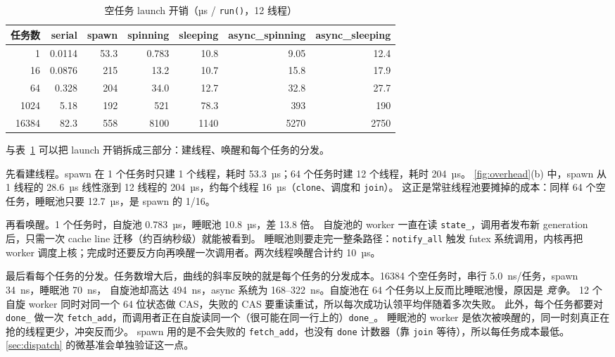 \documentclass[11pt,a4paper]{ctexart}
\begin{document}
\begin{table}[H]
\centering
\caption{空任务 launch 开销（µs / \texttt{run()}，12 线程）}
\label{tab:overhead}
\small
\begin{tabular}{rrrrrrr}
\toprule
任务数 & serial & spawn & spinning & sleeping & async\_\allowbreak{}spinning & async\_\allowbreak{}sleeping \\
\midrule
1 & 0.0114 & 53.3 & 0.783 & 10.8 & 9.05 & 12.4 \\
16 & 0.0876 & 215 & 13.2 & 10.7 & 15.8 & 17.9 \\
64 & 0.328 & 204 & 34.0 & 12.7 & 32.8 & 27.7 \\
1024 & 5.18 & 192 & 521 & 78.3 & 393 & 190 \\
16384 & 82.3 & 558 & 8100 & 1140 & 5270 & 2750 \\
\bottomrule
\end{tabular}
\end{table}

 与表~\ref{tab:overhead} 可以把 launch 开销拆成三部分：建线程、唤醒和每个任务的分发。

先看建线程。spawn 在 1 个任务时只建 1 个线程，耗时 53.3~µs；64 个任务时建 12 个线程，耗时 204~µs。
\cref{fig:overhead}(b) 中，spawn 从 1 线程的 28.6~µs 线性涨到 12 线程的 204~µs，约每个线程 16~µs（\texttt{clone}、调度和 \texttt{join}）。
这正是常驻线程池要摊掉的成本：同样 64 个空任务，睡眠池只要 12.7~µs，是 spawn 的 1/16。

再看唤醒。1 个任务时，自旋池 0.783~µs，睡眠池 10.8~µs，差 13.8 倍。
自旋池的 worker 一直在读 \texttt{state\_\allowbreak{}}，调用者发布新 generation 后，只需一次 cache line 迁移（约百纳秒级）就能被看到。
睡眠池则要走完一整条路径：\texttt{notify\_\allowbreak{}all} 触发 futex 系统调用，内核再把 worker 调度上核；完成时还要反方向再唤醒一次调用者。两次线程唤醒合计约 10~µs。

最后看每个任务的分发。任务数增大后，曲线的斜率反映的就是每个任务的分发成本。16384 个空任务时，串行 5.0~ns/任务，spawn 34~ns，睡眠池 70~ns，
自旋池却高达 494~ns，async 系统为 168--322~ns。自旋池在 64 个任务以上反而比睡眠池慢，原因是 \emph{竞争}。
12 个自旋 worker 同时对同一个 64 位状态做 CAS，失败的 CAS 要重读重试，所以每次成功认领平均伴随着多次失败。
此外，每个任务都要对 \texttt{done\_\allowbreak{}} 做一次 \texttt{fetch\_\allowbreak{}add}，而调用者正在自旋读同一个（很可能在同一行上的）\texttt{done\_\allowbreak{}}。
睡眠池的 worker 是依次被唤醒的，同一时刻真正在抢的线程更少，冲突反而少。
spawn 用的是不会失败的 \texttt{fetch\_\allowbreak{}add}，也没有 \texttt{done} 计数器（靠 \texttt{join} 等待），所以每任务成本最低。
\cref{sec:dispatch} 的微基准会单独验证这一点。
\end{document}

